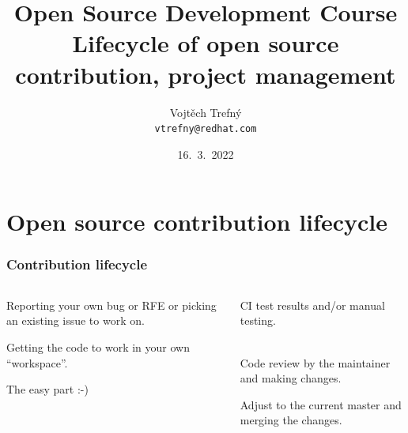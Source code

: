 \documentclass[aspectratio=169]{beamer}              %
\title[Open Source Development Course]{Open Source Development Course\\ \small Lifecycle of open source contribution, project management}
\author{Vojtěch Trefný\\ \small \texttt{vtrefny@redhat.com}\\}
\date{16.~3.~2022}
\institute{\faTwitter\, \href{https://twitter.com/vojtechtrefny}{twitter.com/vojtechtrefny} \\ \faGithub\, \href{https://github.com/vojtechtrefny}{github.com/vojtechtrefny} \\ \faGitlab\ \href{https://gitlab.com/vtrefny}{gitlab.com/vtrefny}}
\begin{document}
{ 
\begin{frame}
\titlepage
\end{frame}
}

\newcommand*\openquote{\makebox(25,-22){\scalebox{5}{``}}}
\newcommand*\closequote{\makebox(25,-22){\scalebox{5}{''}}}


\section{Open source contribution lifecycle}

\begin{frame}
	\frametitle{Contribution lifecycle}
	
\begin{columns}
\begin{column}{0.5\textwidth}
   	\begin{block}{\color{orange}{1. Issue}}
   		\vspace{1mm}
Reporting your own bug or RFE or picking an existing issue to work on.
	\end{block}
	\begin{block}{\color{orange}{2. Fork}}
   		\vspace{1mm}
Getting the code to work in your own ``workspace''.
     \end{block}
         \begin{block}{\color{orange}{3. Development}}
   		\vspace{1mm}
The easy part :-)\\~
     \end{block}
     
\end{column}
\begin{column}{0.5\textwidth} 
\begin{block}{\color{orange}{4. Tests}}
   		\vspace{1mm}
CI test results and/or manual testing.\\~
     \end{block}
      \begin{block}{\color{orange}{5. Code review}}
   		\vspace{1mm}
Code review by the maintainer and making changes.
     \end{block}
      \begin{block}{\color{orange}{6. Rebase \& merge}}
   		\vspace{1mm}
Adjust to the current master and merging the changes.
     \end{block}
\end{column}
\end{columns}
\end{frame}
\end{document}
